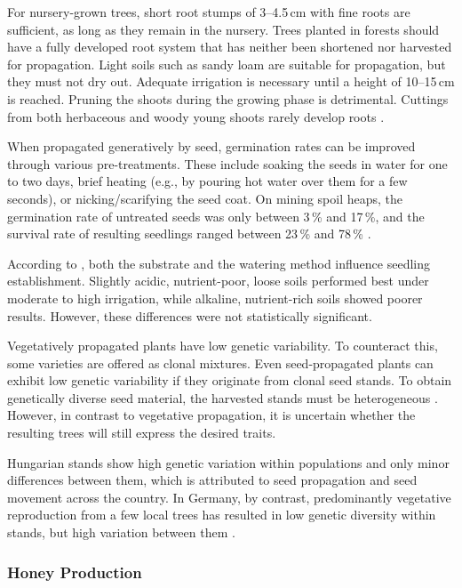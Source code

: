 For nursery-grown trees, short root stumps of 3–4.5\,cm with fine roots are sufficient, as long as they remain in the nursery. Trees planted in forests should have a fully developed root system that has neither been shortened nor harvested for propagation. Light soils such as sandy loam are suitable for propagation, but they must not dry out. Adequate irrigation is necessary until a height of 10–15\,cm is reached. Pruning the shoots during the growing phase is detrimental. Cuttings from both herbaceous and woody young shoots rarely develop roots \citep{swingle1937robinie,redei2001robinieVermehrung,redei2005robinieVermehrung}.

When propagated generatively by seed, germination rates can be improved through various pre-treatments. These include soaking the seeds in water for one to two days, brief heating (e.g., by pouring hot water over them for a few seconds), or nicking/scarifying the seed coat. On mining spoil heaps, the germination rate of untreated seeds was only between 3\,\% and 17\,\%, and the survival rate of resulting seedlings ranged between 23\,\% and 78\,\% \citep{limstrom1949robinie}.

According to \citet{draghici2024robinie}, both the substrate and the watering method influence seedling establishment. Slightly acidic, nutrient-poor, loose soils performed best under moderate to high irrigation, while alkaline, nutrient-rich soils showed poorer results. However, these differences were not statistically significant.

Vegetatively propagated plants have low genetic variability. To counteract this, some varieties are offered as clonal mixtures. Even seed-propagated plants can exhibit low genetic variability if they originate from clonal seed stands. To obtain genetically diverse seed material, the harvested stands must be heterogeneous \citep{pakull2024robinieKlon}. However, in contrast to vegetative propagation, it is uncertain whether the resulting trees will still express the desired traits.

Hungarian stands show high genetic variation within populations and only minor differences between them, which is attributed to seed propagation and seed movement across the country. In Germany, by contrast, predominantly vegetative reproduction from a few local trees has resulted in low genetic diversity within stands, but high variation between them \citep{liesebach2011robinie}.

\subsubsection{Honey Production}

